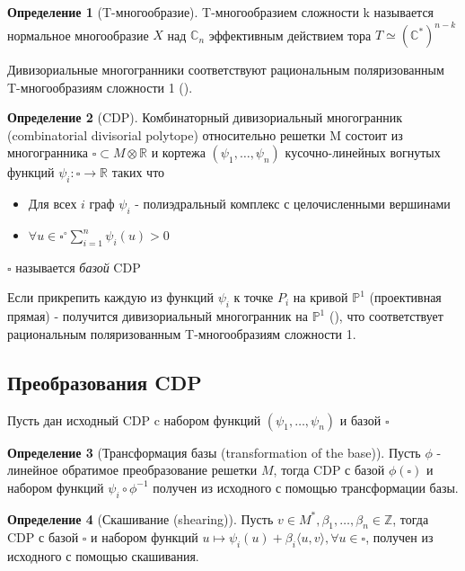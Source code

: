 \documentclass[fontsize=14pt]{scrartcl}
\theoremstyle{definition}
\newtheorem{definition}{Определение}[section]
\begin{document}
\begin{definition}[T-многообразие]
T-многообразием сложности k называется нормальное многообразие $X$ над $\mathds{C}_n$ эффективным действием тора $T \simeq (\mathds{C}^{*})^{n-k}$
\end{definition}

Дивизориальные многогранники соответствуют рациональным поляризованным T-многообразиям сложности 1 (\cite{vars}).

\begin{definition}[CDP] 
Комбинаторный дивизориальный многогранник (combinatorial divisorial polytope) относительно решетки M состоит из многогранника $\square \subset M \otimes \mathds{R}$ и кортежа $(\psi_1, \dots, \psi_n)$ кусочно-линейных вогнутых функций $\psi_i: \square \rightarrow \mathds{R}$ таких что
\begin{itemize}
	\item[1] Для всех $i$ граф $\psi_i$ - полиэдральный комплекс с целочисленными вершинами
	\item[2] $\forall u \in \square^{\circ} \sum_{i=1}^n\psi_i(u) > 0$
\end{itemize}
$\square$ называется \emph{базой} CDP
\end{definition}

Если прикрепить каждую из функций $\psi_i$ к точке $P_i$ на кривой $\mathds{P}^1$ (проективная прямая) - получится дивизориальный многогранник на $\mathds{P}^1$ (\cite{main}), что соответствует рациональным поляризованным T-многообразиям сложности 1.

\subsection{Преобразования CDP}
Пусть дан исходный CDP c набором функций $(\psi_1, \dots, \psi_n)$ и базой $\square$

\begin{definition}[Трансформация базы (transformation of the base)]
Пусть $\phi$ - линейное обратимое преобразование решетки $M$, тогда CDP с базой $\phi(\square)$ и набором функций 
$\psi_i \circ \phi^{-1}$ получен из исходного с помощью  трансформации базы.
\end{definition}

\begin{definition}[Скашивание (shearing)]
Пусть $v \in M^*, \beta_1, \dots, \beta_n \in \mathds{Z}$, тогда CDP с базой $\square$ и набором функций $u \mapsto
 \psi_i(u) + \beta_i\langle u, v \rangle, \forall u \in \square$, получен из исходного с помощью скашивания.
\end{definition}
\end{document}
